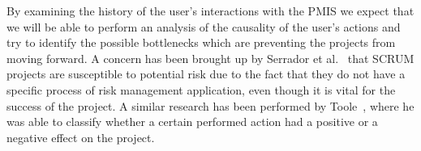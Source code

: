 \documentclass[a4paper, 12pt]{article}
\begin{document}
By examining the history of the user's interactions with the PMIS we expect that we will be able to perform an analysis of the causality of the user's actions and try to identify the possible bottlenecks which are preventing the projects from moving forward. A concern has been brought up by Serrador et al.~\cite{tavares2019risk} that SCRUM projects are susceptible to potential risk due to the fact that they do not have a specific process of risk management application, even though it is vital for the success of the project. A similar research has been performed by Toole~\cite{Toole2006APM}, where he was able to classify whether a certain performed action had a positive or a negative effect on the project.

%
%
%
%
%
%
%
%
%
%
%
%
\end{document}
